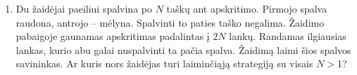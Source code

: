 \begin{enumerate}
  \item {} Du žaidėjai paeiliui spalvina po
    $N$ taškų ant apskritimo. Pirmojo spalva raudona, antrojo – mėlyna.
    Spalvinti to paties taško negalima. Žaidimo pabaigoje gaunamas
    apskritimas padalintas į $2N$ lankų. Randamas ilgiausias lankas, kurio
    abu galai nuspalvinti ta pačia spalva. Žaidimą laimi šios spalvos
    savininkas. Ar kuris nors žaidėjas turi laiminčiąją strategiją su visais
    $N>$1? 


\end{enumerate}
